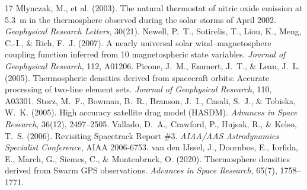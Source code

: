 \documentclass[11pt]{article}
\begin{document}
\begin{thebibliography}{17}
 Mlynczak, M., et al. (2003). The natural thermostat of nitric oxide emission at 5.3~\textmu m in the thermosphere observed during the solar storms of April 2002. \textit{Geophysical Research Letters}, 30(21).
 Newell, P.~T., Sotirelis, T., Liou, K., Meng, C.-I., \& Rich, F.~J. (2007). A nearly universal solar wind--magnetosphere coupling function inferred from 10 magnetospheric state variables. \textit{Journal of Geophysical Research}, 112, A01206.
 Picone, J.~M., Emmert, J.~T., \& Lean, J.~L. (2005). Thermospheric densities derived from spacecraft orbits: Accurate processing of two-line element sets. \textit{Journal of Geophysical Research}, 110, A03301.
 Storz, M.~F., Bowman, B.~R., Branson, J.~I., Casali, S.~J., \& Tobiska, W.~K. (2005). High accuracy satellite drag model (HASDM). \textit{Advances in Space Research}, 36(12), 2497--2505.
 Vallado, D.~A., Crawford, P., Hujsak, R., \& Kelso, T.~S. (2006). Revisiting Spacetrack Report \#3. \textit{AIAA/AAS Astrodynamics Specialist Conference}, AIAA 2006-6753.
 van den IJssel, J., Doornbos, E., Iorfida, E., March, G., Siemes, C., \& Montenbruck, O. (2020). Thermosphere densities derived from Swarm GPS observations. \textit{Advances in Space Research}, 65(7), 1758--1771.
\end{thebibliography}

\appendix
\end{document}
